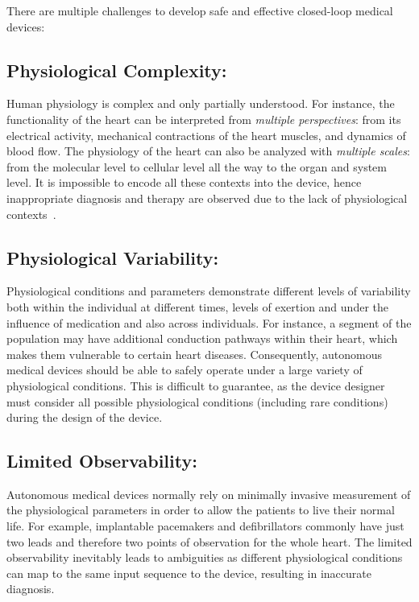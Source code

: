 There are multiple challenges to develop safe and effective closed-loop medical devices:

\subsection{Physiological Complexity:} Human physiology is complex and only partially understood. For instance, the functionality of the heart can be interpreted from \emph{multiple perspectives}: from its electrical activity, mechanical contractions of the heart muscles, and dynamics of blood flow. The physiology of the heart can also be analyzed with \emph{multiple scales}: from the molecular level to cellular level all the way to the organ and system level. It is impossible to encode all these contexts into the device, hence inappropriate diagnosis and therapy are observed due to the lack of physiological contexts~\cite{killedbycode, icd_recall}.
	\subsection{Physiological Variability:} Physiological conditions and parameters demonstrate different levels of variability both within the individual at different times, levels of exertion and under the influence of medication and also across individuals. For instance, a segment of the population may have additional conduction pathways within their heart, which makes them vulnerable to certain heart diseases. Consequently, autonomous medical devices should be able to safely operate under a large variety of physiological conditions. This is difficult to guarantee, as the device designer must consider all possible physiological conditions (including rare conditions) during the design of the device.
	
	\subsection{Limited Observability:} Autonomous medical devices normally rely on minimally invasive measurement of the physiological parameters in order to allow the patients to live their normal life. For example, implantable pacemakers and defibrillators commonly have just two leads and therefore two points of observation for the whole heart. The limited observability inevitably leads to ambiguities as different physiological conditions can map to the same input sequence to the device, resulting in inaccurate diagnosis. 

